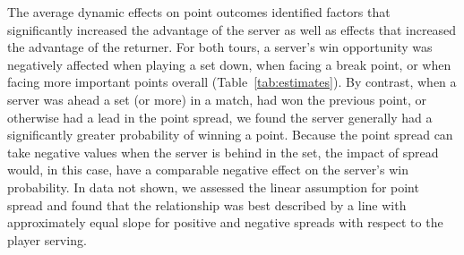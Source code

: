 \documentclass{Latex/svjour3}
\begin{document}
The average dynamic effects on point outcomes identified factors that
significantly increased the advantage of the server as well as effects that
increased the advantage of the returner. For both tours, a server's win
opportunity was negatively affected when playing a set down, when facing a break
point, or when facing more important points overall
(Table~\ref{tab:estimates}). By contrast, when a server was ahead a set (or
more) in a match, had won the previous point, or otherwise had a lead in the
point spread, we found the server generally had a significantly greater
probability of winning a point. Because the point spread can take negative
values when the server is behind in the set, the impact of spread would, in this
case, have a comparable negative effect on the server's win probability. In data
not shown, we assessed the linear assumption for point spread and found that the
relationship was best described by a line with approximately equal slope for
positive and negative spreads with respect to the player serving.
\end{document}
